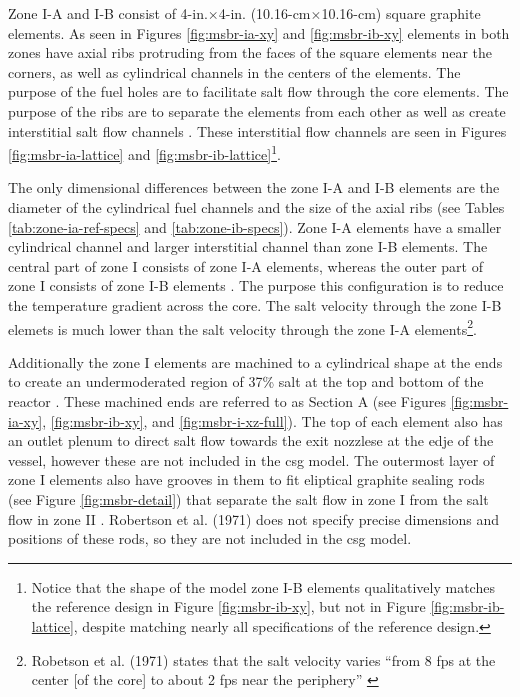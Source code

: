 Zone I-A and I-B consist of 4-in.$\times$4-in. (10.16-cm$\times$10.16-cm)
square graphite elements. As seen in Figures \ref{fig:msbr-ia-xy} and
\ref{fig:msbr-ib-xy} elements in both zones have axial ribs protruding from
the faces of the square elements near the corners, as well as cylindrical
channels in the centers of the elements. The purpose of the fuel holes are to
facilitate salt flow through the core elements. The purpose of the ribs are to
separate the elements from each other as well as create interstitial salt flow
channels \cite{robertson_conceptual_1971}. These interstitial flow channels
are seen in Figures \ref{fig:msbr-ia-lattice} and
\ref{fig:msbr-ib-lattice}\footnote{Notice that the shape of the model zone I-B
elements qualitatively matches the reference design in Figure
\ref{fig:msbr-ib-xy}, but  not in Figure \ref{fig:msbr-ib-lattice}, despite
matching nearly all specifications of the reference design.}.

The only dimensional differences between the zone I-A and I-B elements are the
diameter of the cylindrical fuel channels and the size of the axial ribs (see
Tables \ref{tab:zone-ia-ref-specs} and \ref{tab:zone-ib-specs}). Zone I-A
elements have a smaller cylindrical channel and larger interstitial channel
than zone I-B elements. The central part of zone I consists of zone I-A
elements, whereas the outer part of zone I consists of zone I-B
elements \cite{robertson_conceptual_1971}. The purpose this configuration is to
reduce the temperature gradient across the core. The salt velocity through the
zone I-B elemets is much lower than the salt velocity through the zone I-A
elements\footnote{Robetson et al. (1971) states that the salt velocity varies
``from 8 fps at the center [of the core] to about 2 fps near the periphery''
\cite{robertson_conceptual_1971}}.

Additionally the zone I elements are machined to a cylindrical shape at the ends
to create an undermoderated region of 37\% salt at the top and bottom of the
reactor \cite{robertson_conceptual_1971}. These machined ends are referred to as
Section A (see Figures \ref{fig:msbr-ia-xy}, \ref{fig:msbr-ib-xy}, and
\ref{fig:msbr-i-xz-full}). The top of each element also has an outlet plenum to
direct salt flow towards the exit nozzlese at the edje of the vessel, however
these are not included in the \Gls{csg} model. The outermost layer of zone I
elements also have grooves in them to fit eliptical graphite sealing rods (see
Figure \ref{fig:msbr-detail}) that separate the salt flow in zone I from the
salt flow in zone II \cite{robertson_conceptual_1971}. Robertson et al. (1971)
does not specify precise dimensions and positions of these rods, so they are not
included in the \Gls{csg} model.

